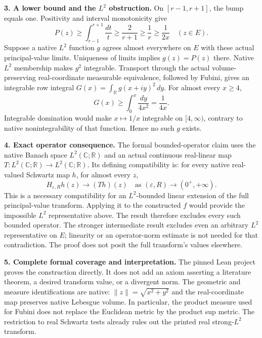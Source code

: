 \documentclass[10pt,a4paper]{article}
\newcommand{\R}{\mathbb R}
\newcommand{\C}{\mathbb C}
\begin{document}
\textbf{3. A lower bound and the $L^2$ obstruction.}
On $[r-1,r+1]$, the bump equals one. Positivity and interval monotonicity give
\[
 P(z)\ge\int_{r-1}^{r+1}\frac{dt}{t}
 \ge\frac{2}{r+1}\ge\frac1r\ge\frac1{2x}\quad(z\in E).
\]
Suppose a native $L^2$ function $g$ agrees almost everywhere on $E$ with
these actual principal-value limits. Uniqueness of limits implies
$g(z)=P(z)$ there. Native $L^2$ membership makes $g^2$ integrable.
Transport through the actual volume-preserving real-coordinate measurable
equivalence, followed by Fubini, gives an integrable row integral
$G(x)=\int_\R g(x+iy)^2\,dy$. For almost every $x\ge4$,
\[
 G(x)\ge\int_0^x\frac{dy}{4x^2}=\frac1{4x}.
\]
Integrable domination would make $x\mapsto1/x$ integrable on $[4,\infty)$,
contrary to native nonintegrability of that function. Hence no such $g$ exists.

\newpage
\textbf{4. Exact operator consequence.}
The formal bounded-operator claim uses the native Banach space
$L^2(\C;\R)$ and an actual continuous real-linear map
$T:L^2(\C;\R)\to L^2(\C;\R)$. Its defining compatibility is: for every
native real-valued Schwartz map $h$, for almost every $z$,
\[
 H_{\varepsilon,R}h(z)\longrightarrow (T h)(z)
 \quad\text{as }(\varepsilon,R)\to(0^+,+\infty).
\]
This is a necessary compatibility for an $L^2$-bounded linear extension
of the full principal-value transform. Applying it to the constructed
$f$ would provide the impossible $L^2$ representative above. The result
therefore excludes every such bounded operator. The stronger intermediate
result excludes even an arbitrary $L^2$ representative on $E$; linearity
or an operator-norm estimate is not needed for that contradiction.
The proof does not posit the full transform's values elsewhere.

\textbf{5. Complete formal coverage and interpretation.}
The pinned Lean project proves the construction directly. It does not add
an axiom asserting a literature theorem, a desired transform value, or a
divergent norm. The geometric and measure identifications are native:
$\|z\|=\sqrt{x^2+y^2}$ and the real-coordinate map preserves native Lebesgue
volume. In particular, the product measure used for Fubini does not replace
the Euclidean metric by the product sup metric. The restriction to real
Schwartz tests already rules out the printed real strong-$L^2$ transform.
\end{document}
